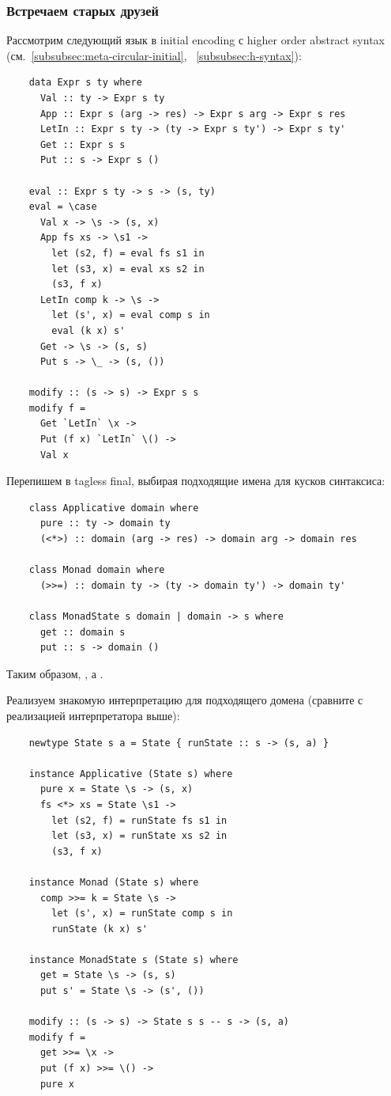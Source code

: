 \subsubsection{Встречаем старых друзей}

Рассмотрим следующий язык в initial encoding с higher order abstract syntax (см.~\ref{subsubsec:meta-circular-initial}, ~\ref{subsubsec:h-syntax}):
\begin{verbatim}
    data Expr s ty where
      Val :: ty -> Expr s ty
      App :: Expr s (arg -> res) -> Expr s arg -> Expr s res
      LetIn :: Expr s ty -> (ty -> Expr s ty') -> Expr s ty'
      Get :: Expr s s
      Put :: s -> Expr s ()

    eval :: Expr s ty -> s -> (s, ty)
    eval = \case
      Val x -> \s -> (s, x)
      App fs xs -> \s1 ->
        let (s2, f) = eval fs s1 in
        let (s3, x) = eval xs s2 in
        (s3, f x)
      LetIn comp k -> \s ->
        let (s', x) = eval comp s in
        eval (k x) s'
      Get -> \s -> (s, s)
      Put s -> \_ -> (s, ())

    modify :: (s -> s) -> Expr s s
    modify f =
      Get `LetIn` \x ->
      Put (f x) `LetIn` \() ->
      Val x
\end{verbatim}

Перепишем в tagless final, выбирая подходящие имена для кусков синтаксиса:
\begin{verbatim}
    class Applicative domain where
      pure :: ty -> domain ty
      (<*>) :: domain (arg -> res) -> domain arg -> domain res

    class Monad domain where
      (>>=) :: domain ty -> (ty -> domain ty') -> domain ty'

    class MonadState s domain | domain -> s where
      get :: domain s
      put :: s -> domain ()
\end{verbatim}

Таким образом, , а .

Реализуем знакомую интерпретацию для подходящего домена (сравните с реализацией интерпретатора выше):
\begin{verbatim}
    newtype State s a = State { runState :: s -> (s, a) }

    instance Applicative (State s) where
      pure x = State \s -> (s, x)
      fs <*> xs = State \s1 ->
        let (s2, f) = runState fs s1 in
        let (s3, x) = runState xs s2 in
        (s3, f x)

    instance Monad (State s) where
      comp >>= k = State \s ->
        let (s', x) = runState comp s in
        runState (k x) s'

    instance MonadState s (State s) where
      get = State \s -> (s, s)
      put s' = State \s -> (s', ())

    modify :: (s -> s) -> State s s -- s -> (s, a)
    modify f =
      get >>= \x ->
      put (f x) >>= \() ->
      pure x
\end{verbatim}

